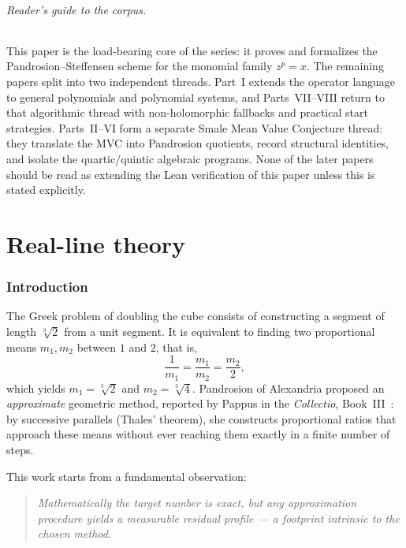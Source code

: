 \documentclass[11pt,a4paper]{article}
\theoremstyle{definition}
\newcommand{\cbrt}[1]{\sqrt[3]{#1}}
\begin{document}
\paragraph{Reader's guide to the corpus.}
This paper is the load-bearing core of the series: it proves and formalizes the
Pandrosion--Steffensen scheme for the monomial family $z^p=x$. The remaining
papers split into two independent threads. Part~I extends the operator
language to general polynomials and polynomial systems, and Parts~VII--VIII
return to that algorithmic thread with non-holomorphic fallbacks and practical
start strategies. Parts~II--VI form a separate Smale Mean Value Conjecture
thread: they translate the MVC into Pandrosion quotients, record structural
identities, and isolate the quartic/quintic algebraic programs. None of the
later papers should be read as extending the Lean verification of this paper
unless this is stated explicitly.

\tableofcontents
\newpage

\part{Real-line theory}

\section{Introduction}

The Greek problem of doubling the cube consists of constructing a segment of length $\cbrt{2}$ from a unit segment. It is equivalent to finding two proportional means $m_1, m_2$ between $1$ and $2$, that is,
\[
  \frac{1}{m_1} = \frac{m_1}{m_2} = \frac{m_2}{2},
\]
which yields $m_1 = \cbrt{2}$ and $m_2 = \cbrt{4}$. Pandrosion of Alexandria proposed an \emph{approximate} geometric method, reported by Pappus in the \textit{Collectio}, Book~III~\cite{pappus}: by successive parallels (Thales' theorem), she constructs proportional ratios that approach these means without ever reaching them exactly in a finite number of steps.

\medskip

This work starts from a fundamental observation:

\begin{quote}
\itshape Mathematically the target number is exact, but any approximation procedure yields a measurable residual profile --- a footprint intrinsic to the chosen method.
\end{quote}
\end{document}
